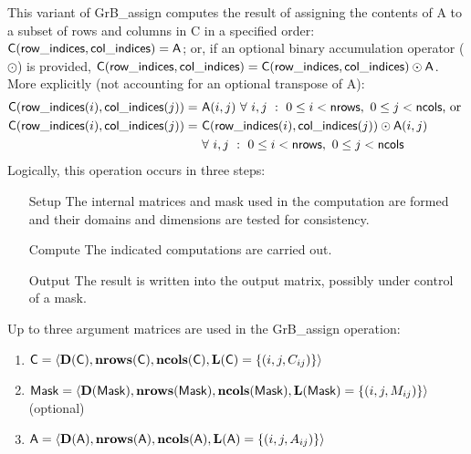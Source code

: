 This variant of {\sf GrB\_assign} computes the result of assigning the contents
of {\sf A} to a subset of rows and columns in {\sf C} in a specified order:
${\sf C}({\sf row\_indices},{\sf col\_indices}) = {\sf A}$; or, if an optional 
binary accumulation operator ($\odot$) is provided, 
${\sf C}({\sf row\_indices},{\sf col\_indices}) = 
{\sf C}({\sf row\_indices},{\sf col\_indices}) \odot {\sf A}$.
More explicitly (not accounting for an optional transpose of {\sf A}):
\[
\begin{aligned}
  	{\sf C}({\sf row\_indices}(i),{\sf col\_indices}(j)) = &\ {\sf A}(i,j) 
 	\ \forall \ i,j \ : \ 0 \leq i < {\sf nrows},\ 0 \leq j < {\sf ncols} \mbox{,~or~}
\\
  	{\sf C}({\sf row\_indices}(i),{\sf col\_indices}(j)) = &\ 
    {\sf C}({\sf row\_indices}(i),{\sf col\_indices}(j)) \odot {\sf A}(i,j) \\
 	& \ \forall \ i,j \ : \ 0 \leq i < {\sf nrows},\ 0 \leq j < {\sf ncols}
\end{aligned}
\]  
Logically, this operation occurs in three steps:
\begin{enumerate}[leftmargin=0.75in]
\item[Setup] The internal matrices and mask used in the computation are formed 
and their domains and dimensions are tested for consistency.
\item[Compute] The indicated computations are carried out.
\item[Output] The result is written into the output matrix, possibly under 
control of a mask.
\end{enumerate}

Up to three argument matrices are used in the {\sf GrB\_assign} operation:
\begin{enumerate}
	\item ${\sf C} = \langle \bold{D}({\sf C}),\bold{nrows}({\sf C}),
    \bold{ncols}({\sf C}),\bold{L}({\sf C}) = \{(i,j,C_{ij}) \} \rangle$
    
	\item ${\sf Mask} = \langle \bold{D}({\sf Mask}),\bold{nrows}({\sf Mask}),
    \bold{ncols}({\sf Mask}),\bold{L}({\sf Mask}) = \{(i,j,M_{ij}) \} \rangle$ (optional)
    
	\item ${\sf A} = \langle \bold{D}({\sf A}),\bold{nrows}({\sf A}), 
    \bold{ncols}({\sf A}),\bold{L}({\sf A}) = \{(i,j,A_{ij}) \} \rangle$
\end{enumerate}

